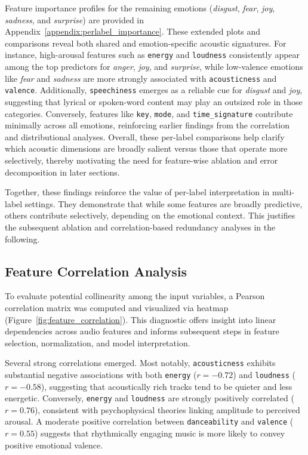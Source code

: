 \documentclass{article}
\begin{document}
Feature importance profiles for the remaining emotions (\textit{disgust}, \textit{fear}, \textit{joy}, \textit{sadness}, and \textit{surprise}) are provided in Appendix~\ref{appendix:perlabel_importance}. These extended plots and comparisons reveal both shared and emotion-specific acoustic signatures. For instance, high-arousal features such as \texttt{energy} and \texttt{loudness} consistently appear among the top predictors for \textit{anger}, \textit{joy}, and \textit{surprise}, while low-valence emotions like \textit{fear} and \textit{sadness} are more strongly associated with \texttt{acousticness} and \texttt{valence}. Additionally, \texttt{speechiness} emerges as a reliable cue for \textit{disgust} and \textit{joy}, suggesting that lyrical or spoken-word content may play an outsized role in those categories. Conversely, features like \texttt{key}, \texttt{mode}, and \texttt{time\_signature} contribute minimally across all emotions, reinforcing earlier findings from the correlation and distributional analyses. Overall, these per-label comparisons help clarify which acoustic dimensions are broadly salient versus those that operate more selectively, thereby motivating the need for feature-wise ablation and error decomposition in later sections.

Together, these findings reinforce the value of per-label interpretation in multi-label settings. They demonstrate that while some features are broadly predictive, others contribute selectively, depending on the emotional context. This justifies the subsequent ablation and correlation-based redundancy analyses in the following.

\subsection{Feature Correlation Analysis}

To evaluate potential collinearity among the input variables, a Pearson correlation matrix was computed and visualized via heatmap (Figure~\ref{fig:feature_correlation}). This diagnostic offers insight into linear dependencies across audio features and informs subsequent steps in feature selection, normalization, and model interpretation.

Several strong correlations emerged. Most notably, \texttt{acousticness} exhibits substantial negative associations with both \texttt{energy} ($r = -0.72$) and \texttt{loudness} ($r = -0.58$), suggesting that acoustically rich tracks tend to be quieter and less energetic. Conversely, \texttt{energy} and \texttt{loudness} are strongly positively correlated ($r = 0.76$), consistent with psychophysical theories linking amplitude to perceived arousal. A moderate positive correlation between \texttt{danceability} and \texttt{valence} ($r = 0.55$) suggests that rhythmically engaging music is more likely to convey positive emotional valence.
\end{document}
